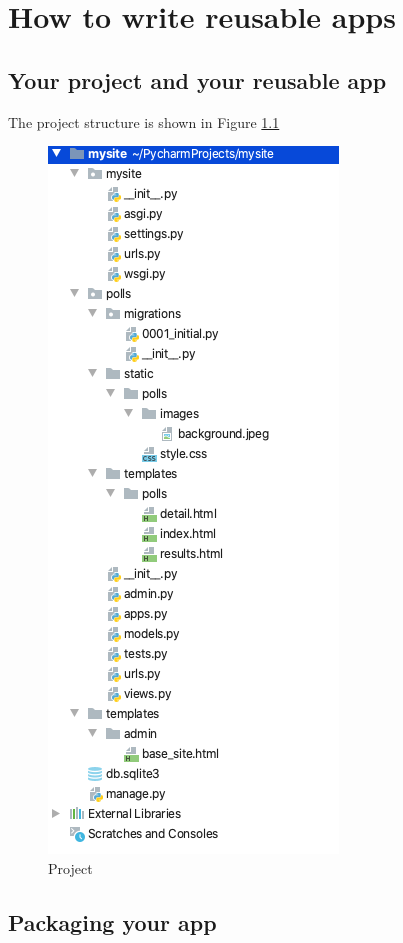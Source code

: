 
\chapter{How to write reusable apps}

\section{Your project and your reusable app}

The project structure is shown in Figure \ref{fig:project}
\begin{figure}[!ht]
  \centering
  \includegraphics[height=\textheight]{project.png}
  \caption{Project}
  \label{fig:project}
\end{figure}


\section{Packaging your app}

